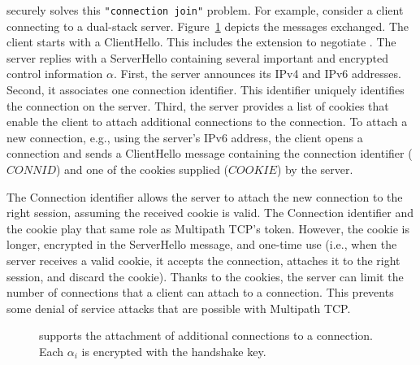 \tcpls securely solves this \texttt{"connection join"} problem. For example, consider a
client connecting to a dual-stack server. Figure~\ref{fig:join-example} depicts
the \tls messages exchanged.  The client starts with a ClientHello. This includes
the \tcpls extension to negotiate \tcpls. The server replies with a ServerHello
containing several important and encrypted control information $\alpha$. First, the server announces
its IPv4 and IPv6 addresses. Second, it associates one connection identifier.
This identifier uniquely identifies the connection on the server. Third, the
server provides a list of cookies that enable the client to attach additional
\tcp connections to the \tcpls connection. To attach a new connection, e.g., using
the server's IPv6 address, the client opens a \tcp connection and sends a
ClientHello message containing the connection identifier ($CONNID$) and one of the cookies
supplied ($COOKIE$) by the server.

The Connection identifier allows the server to attach the new \tcp connection to
the right \tcpls session, assuming the received cookie is valid. The Connection
identifier and the cookie
play that same role as Multipath TCP's token. However, the cookie is longer, encrypted in
the ServerHello message, and one-time use (i.e., when the server receives a valid
cookie, it accepts the connection, attaches it to the right \tcpls session, and
discard the cookie). Thanks to the cookies, the server can
limit the number of \tcp connections that a client can attach to a \tcpls
connection.
This prevents some denial of service attacks that are
possible with Multipath TCP.

\begin{figure}

  \caption{\tcpls supports the attachment of additional \tcp
    connections to a \tcpls connection. Each $\alpha_i$ is encrypted with the
    handshake key.}
  \label{fig:join-example}
\end{figure}

